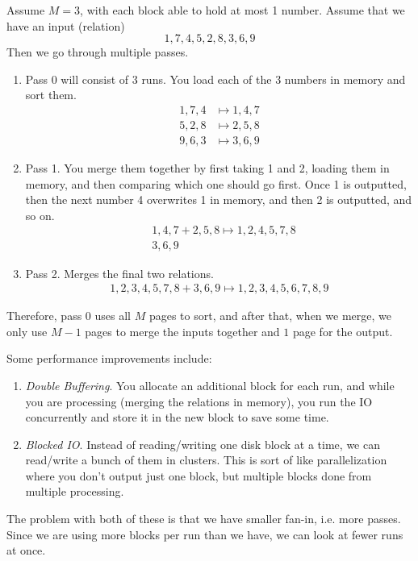 \documentclass{article}
\begin{document}
      \begin{example}
        Assume $M = 3$, with each block able to hold at most 1 number. Assume that we have an input (relation) 
        \begin{equation}
          1, 7, 4, 5, 2, 8, 3, 6, 9
        \end{equation}
        Then we go through multiple passes. 
        \begin{enumerate}
          \item Pass 0 will consist of 3 runs. You load each of the 3 numbers in memory and sort them.  
            \begin{align}
              1, 7, 4 & \mapsto 1, 4, 7 \\ 
              5, 2, 8 & \mapsto 2, 5, 8 \\ 
              9, 6, 3 & \mapsto 3, 6, 9
            \end{align}

          \item Pass 1. You merge them together by first taking 1 and 2, loading them in memory, and then comparing which one should go first. Once 1 is outputted, then the next number 4 overwrites 1 in memory, and then 2 is outputted, and so on. 
            \begin{align}
              & 1, 4, 7 + 2, 5, 8 \mapsto 1, 2, 4, 5, 7, 8 \\ 
              & 3, 6, 9
            \end{align}

          \item Pass 2. Merges the final two relations. 
            \begin{align}
              1, 2, 3, 4, 5, 7, 8 + 3, 6, 9 \mapsto 1, 2, 3, 4, 5, 6, 7, 8, 9
            \end{align}
        \end{enumerate}
        Therefore, pass 0 uses all $M$ pages to sort, and after that, when we merge, we only use $M-1$ pages to merge the inputs together and $1$ page for the output. 
      \end{example}

      Some performance improvements include: 
      \begin{enumerate}
        \item \textit{Double Buffering}. You allocate an additional block for each run, and while you are processing (merging the relations in memory), you run the IO concurrently and store it in the new block to save some time. 
        \item \textit{Blocked IO}. Instead of reading/writing one disk block at a time, we can read/write a bunch of them in clusters. This is sort of like parallelization where you don't output just one block, but multiple blocks done from multiple processing. 
      \end{enumerate}
      The problem with both of these is that we have smaller fan-in, i.e. more passes. Since we are using more blocks per run than we have, we can look at fewer runs at once. 
\end{document}
